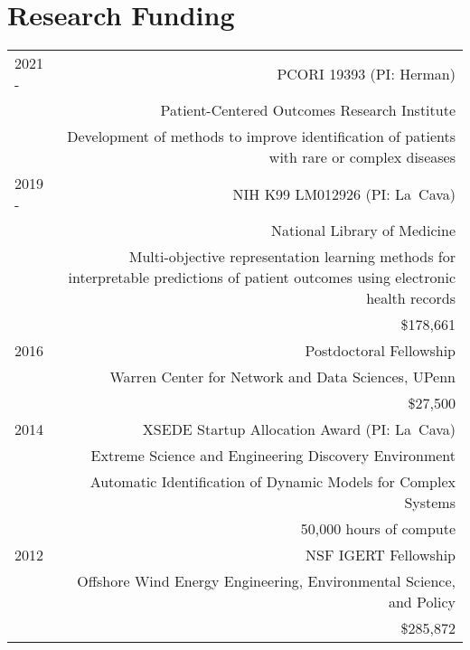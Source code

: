\section*{Research Funding}
\begin{tabular}{L!{\VRule}R}
2021 -  & PCORI 19393 (PI: Herman) \\
        & Patient-Centered Outcomes Research Institute\\
        & Development of methods to improve identification of patients with rare or complex diseases\\
2019 -  & NIH K99 LM012926 (PI: La~Cava) \\
        & National Library of Medicine\\
        & Multi-objective representation learning methods for interpretable predictions of patient outcomes using electronic health records \\
        & \$178,661 \\
2016    & Postdoctoral Fellowship\\
        & Warren Center for Network and Data Sciences, UPenn \\
        & \$27,500\\
2014    & XSEDE Startup Allocation Award (PI: La~Cava)\\
        & Extreme Science and Engineering Discovery Environment\\
        & Automatic Identification of Dynamic Models for Complex Systems  \\
        & 50,000 hours of compute \\
2012    & NSF IGERT Fellowship\\
        & Offshore Wind Energy Engineering, Environmental Science, and Policy \\
        & \$285,872 \\
\end{tabular}
